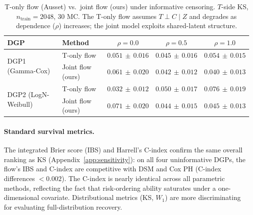 \begin{table}[t]
\caption{T-only flow (Ausset) vs.\ joint flow (ours) under informative
censoring. $T$-side KS, $n_{\text{train}} = 2048$, $30$ MC. The T-only
flow assumes $T \perp C \mid Z$ and degrades as dependence ($\rho$)
increases; the joint model exploits shared-latent structure.}
\label{tab:ausset-ic}
\centering
\small
\begin{tabular}{llccc}
\toprule
DGP & Method & $\rho = 0.0$ & $\rho = 0.5$ & $\rho = 1.0$ \\
\midrule
\multirow{2}{*}{DGP1 (Gamma-Cox)}
  & T-only flow & $\mathbf{0.051\,{\pm}\,0.016}$ & $0.045\,{\pm}\,0.016$ & $0.054\,{\pm}\,0.015$ \\
  & Joint flow (ours) & $0.061\,{\pm}\,0.020$ & $\mathbf{0.042\,{\pm}\,0.012}$ & $\mathbf{0.040\,{\pm}\,0.013}$ \\
\midrule
\multirow{2}{*}{DGP2 (LogN-Weibull)}
  & T-only flow & $\mathbf{0.032\,{\pm}\,0.012}$ & $0.050\,{\pm}\,0.017$ & $0.076\,{\pm}\,0.019$ \\
  & Joint flow (ours) & $0.071\,{\pm}\,0.020$ & $\mathbf{0.044\,{\pm}\,0.015}$ & $\mathbf{0.045\,{\pm}\,0.013}$ \\
\bottomrule
\end{tabular}
\end{table}

\paragraph{Standard survival metrics.}
The integrated Brier score (IBS) and Harrell's C-index confirm the same
overall ranking as KS (Appendix~\ref{app:sensitivity}): on all four
uninformative DGPs, the flow's IBS and C-index are competitive with DSM
and Cox PH (C-index differences $< 0.002$). The C-index is nearly
identical across all parametric methods, reflecting the fact that
risk-ordering ability saturates under a one-dimensional covariate.
Distributional metrics (KS, $W_1$) are more discriminating for
evaluating full-distribution recovery.

